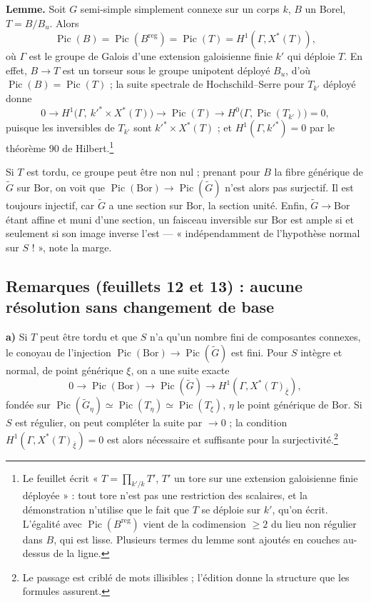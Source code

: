 \documentclass[11pt,a4paper]{article}
\begin{document}
\textbf{Lemme.} Soit $G$ semi-simple simplement connexe sur un corps $k$, $B$
un Borel, $T=B/B_{u}$. Alors
\[
  \operatorname{Pic}(B)=\operatorname{Pic}(B^{\mathrm{reg}})
  =\operatorname{Pic}(T)=H^{1}(\Gamma,X^{*}(T)),
\]
où $\Gamma$ est le groupe de Galois d'une extension galoisienne finie $k'$ qui
déploie $T$. En effet, $B\to T$ est un torseur sous le groupe unipotent
déployé $B_{u}$, d'où $\operatorname{Pic}(B)=\operatorname{Pic}(T)$ ; la suite
spectrale de Hochschild--Serre pour $T_{k'}$ déployé donne
\[
  0\to H^{1}\bigl(\Gamma,\ k'^{*}\times X^{*}(T)\bigr)\to\operatorname{Pic}(T)
  \to H^{0}\bigl(\Gamma,\operatorname{Pic}(T_{k'})\bigr)=0,
\]
puisque les inversibles de $T_{k'}$ sont $k'^{*}\times X^{*}(T)$ ; et
$H^{1}(\Gamma,k'^{*})=0$ par le théorème 90 de Hilbert.\footnote{Le feuillet
écrit « $T=\prod_{k'/k}T'$, $T'$ un tore sur une extension galoisienne finie
déployée » : tout tore n'est pas une restriction des scalaires, et la
démonstration n'utilise que le fait que $T$ se déploie sur $k'$, qu'on écrit.
L'égalité avec $\operatorname{Pic}(B^{\mathrm{reg}})$ vient de la codimension
$\geqslant 2$ du lieu non régulier dans $B$, qui est lisse. Plusieurs termes
du lemme sont ajoutés en couches au-dessus de la ligne.}

Si $T$ est tordu, ce groupe peut être non nul ; prenant pour $B$ la fibre
générique de $\widetilde{G}$ sur $\mathrm{Bor}$, on voit que
$\operatorname{Pic}(\mathrm{Bor})\to\operatorname{Pic}(\widetilde{G})$ n'est
alors pas surjectif. Il est toujours injectif, car $\widetilde{G}$ a une
section sur $\mathrm{Bor}$, la section unité. Enfin, $\widetilde{G}\to
\mathrm{Bor}$ étant affine et muni d'une section, un faisceau inversible sur
$\mathrm{Bor}$ est ample si et seulement si son image inverse l'est —
« indépendamment de l'hypothèse normal sur $S$ ! », note la marge.

\subsection*{Remarques (feuillets 12 et 13) : aucune résolution sans changement de base}

\textbf{a)} Si $T$ peut être tordu et que $S$ n'a qu'un nombre fini de
composantes connexes, le conoyau de l'injection
$\operatorname{Pic}(\mathrm{Bor})\to\operatorname{Pic}(\widetilde{G})$ est
fini. Pour $S$ intègre et normal, de point générique $\xi$, on a une suite
exacte
\[
  0\to\operatorname{Pic}(\mathrm{Bor})\to\operatorname{Pic}(\widetilde{G})
  \to H^{1}(\Gamma,X^{*}(T)_{\bar\xi}),
\]
fondée sur $\operatorname{Pic}(\widetilde{G}_{\eta})\simeq
\operatorname{Pic}(T_{\eta})\simeq\operatorname{Pic}(T_{\xi})$, $\eta$ le point
générique de $\mathrm{Bor}$. Si $S$ est régulier, on peut compléter la suite
par $\to 0$ ; la condition $H^{1}(\Gamma,X^{*}(T)_{\bar\xi})=0$ est alors
nécessaire et suffisante pour la surjectivité.\footnote{Le passage est criblé
de mots illisibles ; l'édition donne la structure que les formules
assurent.}
\end{document}
